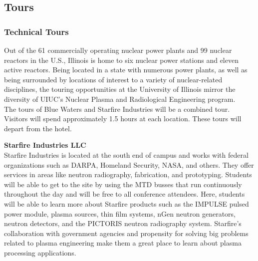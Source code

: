 \subsection{Tours}


\subsubsection{Technical Tours}
Out of the 61 commercially operating nuclear power plants and 99 nuclear reactors in the U.S., Illinois is home to six nuclear power stations and eleven active reactors. Being located in a state with numerous power plants, as well as being surrounded by locations of interest to a variety of nuclear-related disciplines, the touring opportunities at the University of Illinois mirror the diversity of UIUC’s Nuclear Plasma and Radiological Engineering program.\\

The tours of Blue Waters and Starfire Industries will be a combined tour. Visitors will spend approximately 1.5 hours at each location. These tours will depart from the hotel. \\


\textbf{Starfire Industries LLC}\\
Starfire Industries is located at the south end of campus and works with federal organizations such as DARPA, Homeland Security, NASA, and others. They offer services in areas like neutron radiography, fabrication, and prototyping. Students will be able to get to the site by using the MTD busses that run continuously throughout the day and will be free to all conference attendees. Here, students will be able to learn more about Starfire products such as the IMPULSE pulsed power module, plasma sources, thin film systems, nGen neutron generators, neutron detectors, and the PICTORIS neutron radiography system. Starfire’s collaboration with government agencies and propensity for solving big problems related to plasma engineering make them a great place to learn about plasma processing applications.\\

